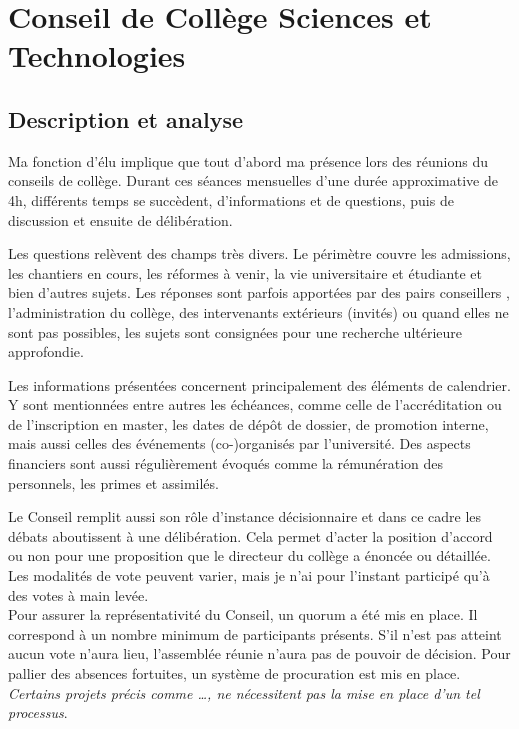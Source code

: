\documentclass{article}
\begin{document}
\section{Conseil de Collège Sciences et Technologies}

\subsection{Description et analyse}
Ma fonction d'élu implique que tout d'abord ma présence lors des réunions du conseils de collège. Durant ces séances mensuelles d'une durée approximative de 4h, différents temps se succèdent, d'informations et de questions, puis de discussion et ensuite de délibération. 

Les questions relèvent des champs très divers. Le périmètre couvre les admissions, les chantiers en cours, les réformes à venir, la vie universitaire et étudiante et bien d'autres sujets. Les réponses sont parfois apportées par des pairs conseillers , l'administration du collège, des intervenants extérieurs (invités) ou quand elles ne sont pas  possibles, les sujets sont consignées pour une recherche ultérieure approfondie. 

Les informations présentées concernent principalement des éléments de calendrier. Y sont mentionnées entre autres les échéances, comme celle de l'accréditation ou de l'inscription en master, les dates de dépôt de dossier, de promotion interne, mais aussi celles des événements (co-)organisés par l'université. Des aspects financiers sont aussi régulièrement évoqués comme la rémunération des personnels, les primes et assimilés. 

Le Conseil remplit aussi son rôle d’instance décisionnaire et dans ce cadre les débats aboutissent à une délibération. 
Cela permet d'acter la position d'accord ou non pour une proposition que le directeur du collège a énoncée ou détaillée. 
Les modalités de vote peuvent varier, mais je n'ai pour l'instant participé qu’à des votes à main levée. \\
Pour assurer la représentativité du Conseil, un quorum a été mis en place. Il correspond à un nombre minimum de participants présents. 
S'il n'est pas atteint aucun vote n'aura lieu, l’assemblée réunie n’aura pas de pouvoir de décision. 
Pour pallier des absences fortuites, un système de procuration est mis en place. \textit{Certains projets précis comme …, ne nécessitent pas la mise en place d’un tel processus}.
\end{document}
